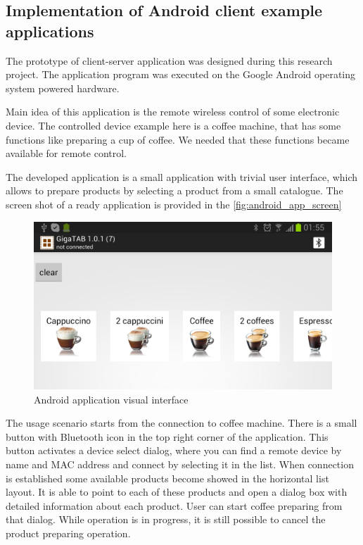 \subsection{Implementation of Android client example applications}

The prototype of client-server application was designed during this research project.
The application program was executed on the Google Android operating system powered hardware.


Main idea of this application is the remote wireless control of some electronic device. 
The controlled device example here is a coffee machine, that has some functions like preparing a cup of coffee.
We needed that these functions became available for remote control.

The developed application is a small application with trivial user interface, which allows to prepare products by selecting a product from a small catalogue. 
The screen shot of a ready application is provided  in the \autoref{fig:android_app_screen}

\begin{center}
 \begin{figure}[h]
	\includegraphics[width=\textwidth]{../images/implementation/android_app_screen.png}
	\caption{Android application visual interface }
	\label{fig:android_app_screen}
 \end{figure}
\end{center}

The usage scenario starts from the connection to coffee machine.
There is a small button with Bluetooth icon in the top right corner of the application.
This button activates a device select dialog, where you can find a remote device by name and MAC address and connect by selecting it in the list.
When connection is established some available products become showed in the horizontal list layout.
It is able to point to each of these products and open a dialog box with detailed information about each product.
User can start coffee preparing from that dialog.
While operation is in progress, it is still possible to cancel the product preparing operation.

